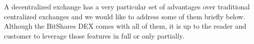 A decentralized exchange has a very particular set of advantages over
traditional centralized exchanges and we would like to address some of them
briefly below. Although the BitShares DEX comes with all of them, it is up to
the reader and customer to leverage those features in full or only partially.
